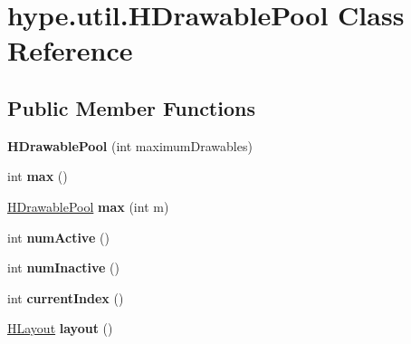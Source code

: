 \hypertarget{classhype_1_1util_1_1_h_drawable_pool}{\section{hype.\-util.\-H\-Drawable\-Pool Class Reference}
\label{classhype_1_1util_1_1_h_drawable_pool}
}
\subsection*{Public Member Functions}
\begin{DoxyCompactItemize}
\item 
\hypertarget{classhype_1_1util_1_1_h_drawable_pool_a3b9a711d1669d793c5fb5c96e128da1e}{{\bfseries H\-Drawable\-Pool} (int maximum\-Drawables)}\label{classhype_1_1util_1_1_h_drawable_pool_a3b9a711d1669d793c5fb5c96e128da1e}

\item 
\hypertarget{classhype_1_1util_1_1_h_drawable_pool_adf9a249ec417c762022a43a0b0910013}{int {\bfseries max} ()}\label{classhype_1_1util_1_1_h_drawable_pool_adf9a249ec417c762022a43a0b0910013}

\item 
\hypertarget{classhype_1_1util_1_1_h_drawable_pool_a4f43c0a1c4f961661ea3e1863be636c1}{\hyperlink{classhype_1_1util_1_1_h_drawable_pool}{H\-Drawable\-Pool} {\bfseries max} (int m)}\label{classhype_1_1util_1_1_h_drawable_pool_a4f43c0a1c4f961661ea3e1863be636c1}

\item 
\hypertarget{classhype_1_1util_1_1_h_drawable_pool_aeb085fa401c9e9aeaa526a48e90f757b}{int {\bfseries num\-Active} ()}\label{classhype_1_1util_1_1_h_drawable_pool_aeb085fa401c9e9aeaa526a48e90f757b}

\item 
\hypertarget{classhype_1_1util_1_1_h_drawable_pool_a4470a068f3167c810b038a61ea4e97ff}{int {\bfseries num\-Inactive} ()}\label{classhype_1_1util_1_1_h_drawable_pool_a4470a068f3167c810b038a61ea4e97ff}

\item 
\hypertarget{classhype_1_1util_1_1_h_drawable_pool_a82f0c3a5068f6a88ba1e21a2312bb1fe}{int {\bfseries current\-Index} ()}\label{classhype_1_1util_1_1_h_drawable_pool_a82f0c3a5068f6a88ba1e21a2312bb1fe}

\item 
\hypertarget{classhype_1_1util_1_1_h_drawable_pool_aded3dc9c7e64da63adff672e780d920d}{\hyperlink{interfacehype_1_1layout_1_1_h_layout}{H\-Layout} {\bfseries layout} ()}\label{classhype_1_1util_1_1_h_drawable_pool_aded3dc9c7e64da63adff672e780d920d}


\end{DoxyCompactItemize}
